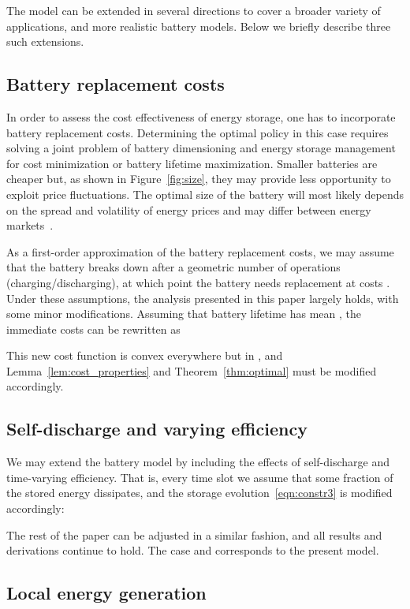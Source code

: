 \documentclass[journal]{IEEEtran}
\newcommand\1{\mathbf{1}}
\begin{document}
The model can be extended in several directions to cover a broader variety of applications, and more realistic battery models. Below we briefly describe three such extensions.


\subsection{Battery replacement costs}
In order to assess the cost effectiveness of energy storage, one has to incorporate battery replacement costs. Determining the optimal policy in this case requires solving a joint problem of battery dimensioning and energy storage management for cost minimization or battery lifetime maximization.  Smaller batteries are cheaper but, as shown in Figure~\ref{fig:size}, they may provide less opportunity to exploit price fluctuations. The optimal size of the battery will most likely depends on the spread and volatility of energy prices and may differ between energy markets~\cite{LF06}.

As a first-order approximation of the battery replacement costs, we may assume that the battery breaks down after a geometric number of operations (charging/discharging), at which point the battery needs replacement at costs . Under these assumptions, the analysis presented in this paper largely holds, with some minor modifications. Assuming that battery lifetime has mean , the immediate costs can be rewritten as

This new cost function is convex everywhere but in , and Lemma~\ref{lem:cost_properties} and Theorem~\ref{thm:optimal} must be modified accordingly.

\subsection{Self-discharge and varying efficiency}

We may extend the battery model by including the effects of self-discharge and time-varying efficiency. That is, every time slot we assume that some fraction  of the stored energy dissipates, and the storage evolution~\eqref{eqn:constr3} is modified accordingly:

The rest of the paper can be adjusted in a similar fashion, and all results and derivations continue to hold. The case  and  corresponds to the present model.

\subsection{Local energy generation}
\end{document}
